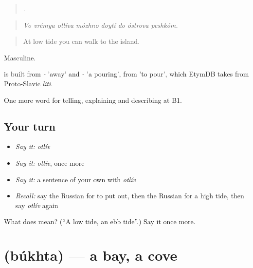 \begin{quote}
       .
\end{quote}

\begin{quote}
\emph{Vo vrémya otlíva mózhno doytí do óstrova peshkóm.}
\end{quote}

\begin{quote}
At low tide you can walk to the island.
\end{quote}

Masculine.

\begin{cousinweb}
\emph{} is built from \emph{-} 'away' and \emph{-} 'a pouring', from \emph{} 'to pour', which EtymDB takes from Proto-Slavic \emph{liti}.
\end{cousinweb}

\begin{grammarlens}[title={What you've built}]
One more word for telling, explaining and describing at B1.
\end{grammarlens}

\subsection*{Your turn}
\begin{itemize}
\raggedright
  \item \emph{Say it:} \emph{otlív}
  \item \emph{Say it:} \emph{otlív}, once more
  \item \emph{Say it:} a sentence of your own with \emph{otlív}
  \item \emph{Recall:} say the Russian for to put out, then the Russian for a high tide, then say \emph{otlív} again
\end{itemize}

\begin{tcolorbox}[breakable,colback=teal!4,colframe=teal!35!black,title={Before you move on}]
What does  mean? (\textquotedblleft{}A low tide, an ebb tide\textquotedblright{}.) Say it once more.
\end{tcolorbox}
\section[\texorpdfstring{\ru{бухта} (búkhta)}{бухта (búkhta)}]{ (búkhta) — a bay, a cove}

